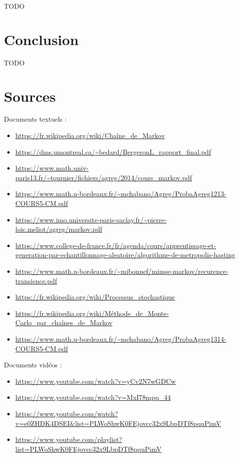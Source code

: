 \documentclass{article}
\begin{document}
TODO \\

\newpage
\section{Conclusion}

TODO \\

\newpage
\section{Sources}

Documents textuels :
\begin{itemize}
\item \url{https://fr.wikipedia.org/wiki/Chaîne_de_Markov}
\item \url{https://dms.umontreal.ca/~bedard/BergeronL_rapport_final.pdf}
\item \url{https://www.math.univ-paris13.fr/~tournier/fichiers/agreg/2014/cours_markov.pdf}
\item \url{https://www.math.u-bordeaux.fr/~mchabano/Agreg/ProbaAgreg1213-COURS5-CM.pdf}
\item \url{https://www.imo.universite-paris-saclay.fr/~pierre-loic.meliot/agreg/markov.pdf}
\item \url{https://www.college-de-france.fr/fr/agenda/cours/apprentissage-et-generation-par-echantillonnage-aleatoire/algorithme-de-metropolis-hasting}
\item \url{https://www.math.u-bordeaux.fr/~mibonnef/mimse-markov/recurence-transience.pdf}
\item \url{https://fr.wikipedia.org/wiki/Processus_stochastique}
\item \url{https://fr.wikipedia.org/wiki/Méthode_de_Monte-Carlo_par_chaînes_de_Markov}
\item \url{https://www.math.u-bordeaux.fr/~mchabano/Agreg/ProbaAgreg1314-COURS5-CM.pdf} \\
\end{itemize}

Documents vidéos :
\begin{itemize}
\item \url{https://www.youtube.com/watch?v=yCv2N7wGDCw}
\item \url{https://www.youtube.com/watch?v=MxI78mpq_44}
\item \url{https://www.youtube.com/watch?v=e0ZHDK4DSEI&list=PLWoShwK0FEjovcc32x9LbpDTf8pquPimV}
\item \url{https://www.youtube.com/playlist?list=PLWoShwK0FEjovcc32x9LbpDTf8pquPimV} \\
\end{itemize}
\end{document}
